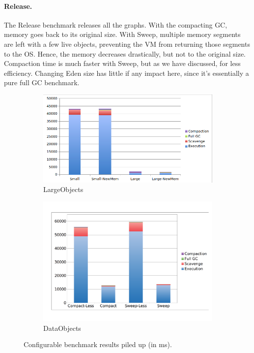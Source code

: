 \documentclass[10pt, sigplan]{acmart}
\begin{document}
\paragraph{Release.} The Release benchmark releases all the graphs. With the compacting GC, memory goes back to its original size. With Sweep, multiple memory segments are left with a few live objects, preventing the VM from returning those segments to the OS. Hence, the memory decreases drastically, but not to the original size. Compaction time is much faster with Sweep, but as we have discussed, for less efficiency. Changing Eden size has little if any impact here, since it's essentially a pure full GC benchmark.


\begin{figure}[b!]
	\centering
    
    \begin{subfigure}[b]{.48\textwidth}
	\includegraphics[width=\linewidth]{figures/big} 
	\caption{LargeObjects\vspace{0.2cm}}
   	\end{subfigure}\hspace{0.03\textwidth}%
   	\begin{subfigure}[b]{.48\textwidth}
	\includegraphics[width=\linewidth]{figures/data} 
	\caption{DataObjects\vspace{0.2cm}}
   	\end{subfigure}	

   	   	    	
\caption{Configurable benchmark results piled up (in ms).} \label{ConfigRes1}
\end{figure}
\end{document}
